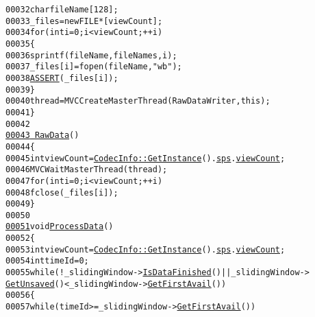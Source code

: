 \begin{footnotesize}
\begin{alltt}
00032                 \textcolor{keywordtype}{char} fileName[128];
00033                 \_files = \textcolor{keyword}{new} FILE*[viewCount];
00034                 \textcolor{keywordflow}{for} (\textcolor{keywordtype}{int} i = 0; i < viewCount; ++i)
00035                 \{
00036                         sprintf(fileName, fileNames, i);
00037                         \_files[i] = fopen(fileName, \textcolor{stringliteral}{"wb"});
00038                         \hyperlink{_debug_8h_a101586fab2b90a8adffe50a3550e235d}{ASSERT}(\_files[i]);
00039                 \}
00040                 thread = MVCCreateMasterThread(RawDataWriter, \textcolor{keyword}{this});
00041         \}
00042 
\hypertarget{_raw_data_8h_source_l00043}{}\hyperlink{class_raw_data_a214d10a81d07c892cb7b35653772e4e4}{00043}         \hyperlink{class_raw_data_a214d10a81d07c892cb7b35653772e4e4}{~RawData}()
00044         \{
00045                 \textcolor{keywordtype}{int} viewCount = \hyperlink{class_codec_info_ad439fd8062a03d868dfe9c9b615b747e}{CodecInfo::GetInstance}().\hyperlink{class_codec_info_aee785011cec77ff3c0c646b498fe1e7d}{sps}.\hyperlink{struct_sequence_parameters_set_af32c7819f630856ccd99aaf78e8f656c}{viewCount};
00046                 MVCWaitMasterThread(thread);
00047                 \textcolor{keywordflow}{for} (\textcolor{keywordtype}{int} i = 0; i < viewCount; ++i)
00048                         fclose(\_files[i]);
00049         \}
00050 
\hypertarget{_raw_data_8h_source_l00051}{}\hyperlink{class_raw_data_ac1edea5cb8ba51fd52541b415ba36ec2}{00051}         \textcolor{keywordtype}{void} \hyperlink{class_raw_data_ac1edea5cb8ba51fd52541b415ba36ec2}{ProcessData}()
00052         \{
00053                 \textcolor{keywordtype}{int} viewCount = \hyperlink{class_codec_info_ad439fd8062a03d868dfe9c9b615b747e}{CodecInfo::GetInstance}().\hyperlink{class_codec_info_aee785011cec77ff3c0c646b498fe1e7d}{sps}.\hyperlink{struct_sequence_parameters_set_af32c7819f630856ccd99aaf78e8f656c}{viewCount};
00054                 \textcolor{keywordtype}{int} timeId = 0;
00055                 \textcolor{keywordflow}{while} (!\_slidingWindow->\hyperlink{class_sliding_window_afd67521d283b68f9fbc769ee9c0ba4b4}{IsDataFinished}() || \_slidingWindow->
      \hyperlink{class_sliding_window_a3df64e20282ce10a45c4c3f3011e536d}{GetUnsaved}()<\_slidingWindow->\hyperlink{class_sliding_window_a2128091c76b407cd0e244759ba5a2846}{GetFirstAvail}())
00056                 \{
00057                         \textcolor{keywordflow}{while} (timeId >= \_slidingWindow->\hyperlink{class_sliding_window_a2128091c76b407cd0e244759ba5a2846}{GetFirstAvail}())

\end{alltt}
\end{footnotesize}
